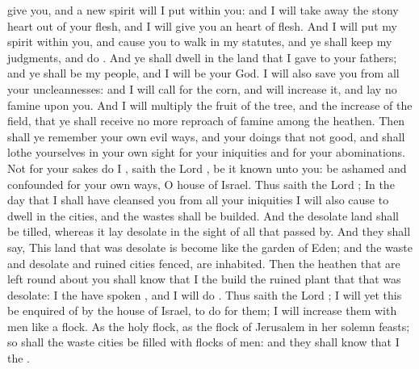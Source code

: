 {give you, and a
new
spirit will I
put
within you: and I will take
away the
stony
heart out of your
flesh, and I will
give you an
heart of
flesh.
And I will
put my
spirit
within you, and
cause you to
walk in my
statutes, and ye shall
keep my
judgments, and
do
{}.
And ye shall
dwell in the
land that I
gave to your
fathers; and ye shall be my
people, and I will be your
God.
I will also
save you from all your
uncleannesses: and I will
call for the
corn, and will
increase it, and
lay no
famine upon you.
And I will
multiply the
fruit of the
tree, and the
increase of the
field, that ye shall
receive no more
reproach of
famine among the
heathen.
Then shall ye
remember your own
evil
ways, and your
doings that
{} not
good, and shall
lothe yourselves in your own
sight for your
iniquities and for your
abominations.
Not for your sakes
do I
{},
saith the
Lord
{}, be it
known unto you: be
ashamed and
confounded for your own
ways, O
house of
Israel.
Thus
saith the
Lord
{}; In the
day that I shall have
cleansed you from all your
iniquities I will also cause
{} to
dwell in the
cities, and the
wastes shall be
builded.
And the
desolate
land shall be
tilled, whereas it lay
desolate in the
sight of all that passed
by.
And they shall
say,
This
land that was
desolate is become like the
garden of
Eden; and the
waste and
desolate and
ruined
cities
{}
fenced,
{} are
inhabited.
Then the
heathen that are
left round
about you shall
know that I the
{}
build the
ruined
{}
plant that that was
desolate: I the
{} have
spoken
{}, and I will
do
{}.
Thus
saith the
Lord
{}; I will yet
{} this be
enquired of by the
house of
Israel, to
do
{} for them; I will
increase them with
men like a
flock.
As the
holy
flock, as the
flock of
Jerusalem in her solemn
feasts; so shall the
waste
cities be
filled with
flocks of
men: and they shall
know that I
{} the
{}.

}
